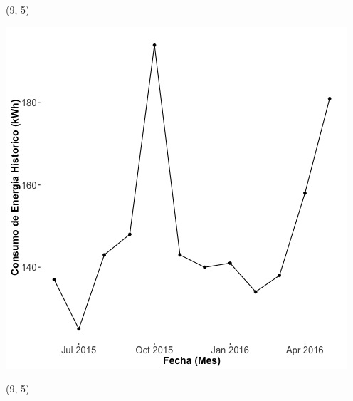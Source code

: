 \documentclass{article}\usepackage[]{graphicx}\usepackage[]{color}
\newenvironment{knitrout}{}{} %
\begin{document}
 \begin{textblock}{1}(9,-5)
\begin{minipage}{20em}
\begingroup

\endgroup
\end{minipage}
\end{textblock}

\begin{knitrout}
\color{fgcolor}
\includegraphics[scale=0.65]{figure/A6_historico_energia} 
\end{knitrout}

 \begin{textblock}{1}(9,-5)
\begin{minipage}{20em}
\begingroup

\endgroup
\end{minipage}
\end{textblock}
\end{document}
